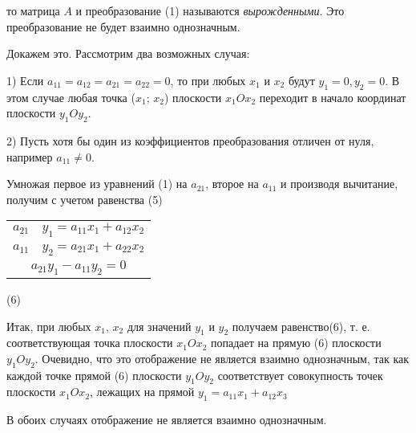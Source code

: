 \documentclass[a4paper, 14pt]{article}
\begin{document}
\thispagestyle{first}


то матрица $A$ и преобразование (1) называются \emph{вырожденными}. Это преобразование не будет взаимно однозначным.

Докажем это. Рассмотрим два возможных случая:

1) Если $a_{11}=a_{12}=a_{21}=a_{22}=0$, то при любых $x_1$ и $x_2$ будут $y_1=0, y_2 = 0$. В этом случае любая точка ($x_{1}$; $x_{2}$) плоскости $x_1Ox_2$ переходит в начало координат плоскости $y_{1}Oy_{2}$.

2) Пусть хотя бы один из коэффициентов преобразования отличен от нуля, например $a_{11} \ne 0$.

Умножая первое из уравнений (1) на $a_{21}$, второе на $a_{11}$ и производя вычитание, получим с учетом равенства (5)

\begin{center}
\begin{tabular}{l | l}
$a_{21}$ & $y_1 = a_{11}x_1 + a_{12}x_2$ \\
$a_{11}$ & $y_2 = a_{21}x_1 + a_{22}x_2$ \\
\hline
\multicolumn{2}{c}{$a_{21}y_1 - a_{11}y_2 = 0$} \\

\end{tabular}
\end{center}


\begin{flushright}
(6)
\end{flushright}

Итак, при любых $x_1$, $x_2$ для значений $y_1$ и $y_2$ получаем равенство(6), т. е. соответствующая точка плоскости $x_1Ox_2$ попадает на прямую (6) плоскости $y_1Oy_2$. Очевидно, что это отображение не является взаимно однозначным, так как каждой точке прямой (6) плоскости $y_1Oy_2$ соответствует совокупность точек плоскости $x_1Ox_2$, лежащих на прямой $y_1=a_{11}x_1 + a_{12}x_3$

В обоих случаях отображение не является взаимно однозначным.
\end{document}
